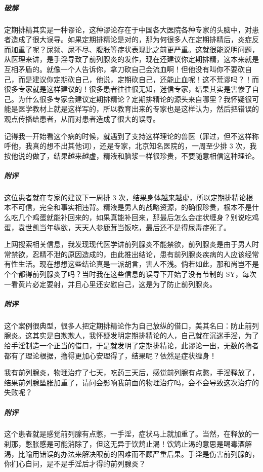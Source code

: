\subparagraph{破解} 定期排精其实是一种谬论，这种谬论存在于中国各大医院各种专家的头脑中，对患者造成了很大误导。如果定期排精论是对的，那为何很多人在定期排精后，炎症反而加重了呢？尿频、尿不尽、腹胀等症状表现比之前更严重。这就很能说明问题，从医理来讲，是手淫导致了前列腺炎的发作，现在还建议你定期排精，这本来就是互相矛盾的。就像一个人告诉你，拿刀砍自己会流血啊！但他没有叫你不要砍自己，而是建议你定期砍自己，他说，定期砍自己，还能止血呢！这不荒谬吗？！而很多专家就是这样建议的！很多患者往往很无知，迷信专家，结果其实是害惨了自己。为什么很多专家会建议定期排精论？定期排精论的源头来自哪里？我怀疑很可能是医学教材上就是这样写的，所以教育出来的专家也是这样认为，然后把错误的观点传播给患者，从而对患者造成了很大的误导。

\begin{case}[定期排精论]
    记得我一开始看这个病的时候，就遇到了支持这样理论的兽医（罪过，但不这样称呼他，我真的想不出其他词），还是专家，北京知名医院的，一周至少排 3 次，我按他说的做了，结果越来越虚，精液和脑浆一样很珍贵，不要随意相信这种理论。
    \subparagraph{附评} 这位患者就在专家的建议下一周排 3 次，结果身体越来越虚，所以定期排精论根本不可信，完全和事实相违背。精液是男人的战略资源，的确很珍贵，根本不是什么吃几个鸡蛋就能补回来的，如果真能补回来，那最后怎么会症状缠身？别说吃鸡蛋，袁世凯当年纵欲，天天人参鹿茸当饭吃，最后还不是得尿毒症死了。
\end{case}

\begin{case}[定期排精论]\label{DingqiPaijingLunJinyuWuhai}
    上网搜索相关信息，我发现现代医学讲前列腺炎不能禁欲，前列腺炎是由于男人时常禁欲，忍精不泄的原因造成的，由此推出结论，患有前列腺炎疾病的人应该经常有性生活。现在想想这些结论真是一派胡言，害人不浅。倘若如此，那和尚岂不是个个都得前列腺炎了吗？当时我在这些信息的误导下开始了没有节制的 SY，每次一看黄片必定要射，并且心里还安慰自己，这是为了防止前列腺炎。
    \subparagraph{附评} 这个案例很典型，很多人把定期排精论作为自己放纵的借口，美其名曰：防止前列腺炎。这其实是自欺欺人，我怀疑发明定期排精论的人，自己就在沉迷手淫，为了给手淫制造一个正当的借口，于是就发明了定期排精论，此谬论一出，无数的撸者都有了理论根据，撸得更加心安理得了，结果呢？依然是症状缠身！
\end{case}

\begin{case}[定期排精论]
    我有前列腺炎，物理治疗了七天，吃药三天后，感觉前列腺有点憋，手淫释放了，结果前列腺坠胀加重了，请问会影响我前面的物理治疗吗，会不会导致这次治疗的失败呢？
    \subparagraph{附评} 这个患者就是感觉前列腺有点憋，一手淫，症状马上就加重了。当然，在释放的一刹那，憋胀感是可能消除了，但这无异于饮鸩止渴！饮鸩止渴的意思是喝毒酒解渴，比喻用错误的办法来解决眼前的困难而不顾严重后果。手淫是伤害前列腺的，你扪心自问，是不是手淫后才得的前列腺炎？
\end{case}

